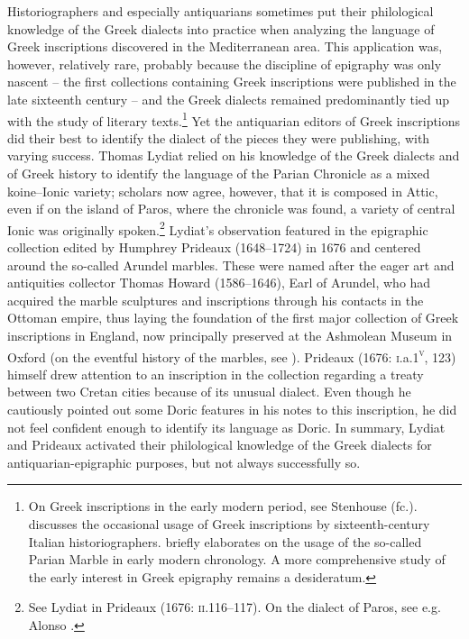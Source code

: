 Historiographers and especially antiquarians sometimes put their philological knowledge of the Greek dialects into practice when analyzing the language of Greek inscriptions discovered in the Mediterranean area. This application was, however, relatively rare, probably because the discipline of epigraphy was only nascent – the first collections containing Greek inscriptions were published in the late sixteenth century – and the Greek dialects remained predominantly tied up with the study of literary texts.\footnote{On Greek inscriptions in the early modern period, see Stenhouse (fc.). \citet{Stenhouse2005} discusses the occasional usage of Greek inscriptions by sixteenth-century Italian historiographers. \citet{Liddel2014} briefly elaborates on the usage of the so-called Parian Marble in early modern chronology. A more comprehensive study of the early interest in Greek epigraphy remains a desideratum.} Yet the antiquarian editors of Greek inscriptions did their best to identify the dialect of the pieces they were publishing, with varying success. Thomas Lydiat relied on his knowledge of the Greek dialects and of Greek history to identify the language of the Parian Chronicle as a mixed koine–Ionic variety; scholars now agree, however, that it is composed in Attic, even if on the island of Paros, where the chronicle was found, a variety of central Ionic was originally spoken.\footnote{See Lydiat in Prideaux (1676: \textsc{ii}.116–117). On the dialect of Paros, see e.g. Alonso \citet[531]{Déniz2018}.} Lydiat’s observation featured in the epigraphic collection edited by Humphrey Prideaux (1648–1724) in 1676 and centered around the so-called Arundel marbles. These were named after the eager art and antiquities collector Thomas Howard (1586–1646), Earl of Arundel, who had acquired the marble sculptures and inscriptions through his contacts in the Ottoman empire, thus laying the foundation of the first major collection of Greek inscriptions in England, now principally preserved at the Ashmolean Museum in Oxford (on the eventful history of the marbles, see \citealt{Vickers2006}). Prideaux (1676: \textsc{i.}a.1\textsc{\textsuperscript{v}}, 123) himself drew attention to an inscription in the collection regarding a treaty between two Cretan cities because of its unusual dialect. Even though he cautiously pointed out some Doric features in his notes to this inscription, he did not feel confident enough to identify its language as Doric. In summary, Lydiat and Prideaux activated their philological knowledge of the Greek dialects for antiquarian-epigraphic purposes, but not always successfully so.

